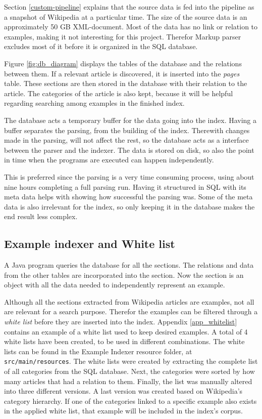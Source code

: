 Section \ref{custom-pipeline} explains that the source data is fed into the pipeline as a snapshot of Wikipedia at a particular time. The size of the source data is an approximately 50 GB XML-document. Most of the data has no link or relation to examples, making it not interesting for this project. Therefor Markup parser excludes most of it before it is organized in the SQL database. 

Figure \ref{fig:db_diagram} displays the tables of the database and the relations between them. If a relevant article is discovered, it is inserted into the \textit{pages} table. These sections are then stored in the database with their relation to the article. The categories of the article is also kept, because it will be helpful regarding searching among examples in the finished index.  

The database acts a temporary buffer for the data going into the index. Having a buffer separates the parsing, from the building of the index. Therewith changes made in the parsing, will not affect the rest, so the database acts as a interface between the parser and the indexer. The data is stored on disk, so also the point in time when the programs are executed can happen independently.

This is preferred since the parsing is a very time consuming process, using about nine hours completing a full parsing run. Having it structured in SQL with its meta data helps with showing how successful the parsing was. Some of the meta data is also irrelevant for the index, so only keeping it in the database  makes the end result less complex.


\subsection{Example indexer and White list} \label{imp_indexer}
A Java program queries the database for all the sections. The relations and data from the other tables are incorporated into the section. Now the section is an object with all the data needed to independently represent an example.

Although all the sections extracted from Wikipedia articles are examples, not all are relevant for a search purpose. Therefor the examples can be filtered through a \textit{white list} before they are inserted into the index. Appendix \ref{app_whitelist} contains an example of a white list used to keep desired examples. A total of 4 white lists have been created, to be used in different combinations. The white lists can be found in the Example Indexer resource folder, at \texttt{src/main/resources}. The white lists were created by extracting the complete list of all categories from the SQL database. Next, the categories were sorted by how many articles that had a relation to them. Finally, the list was manually altered into three different versions. A last version was created based on Wikipedia's category hierarchy. If one of the categories linked to a specific example also exists in the applied white list, that example will be included in the index's corpus.

